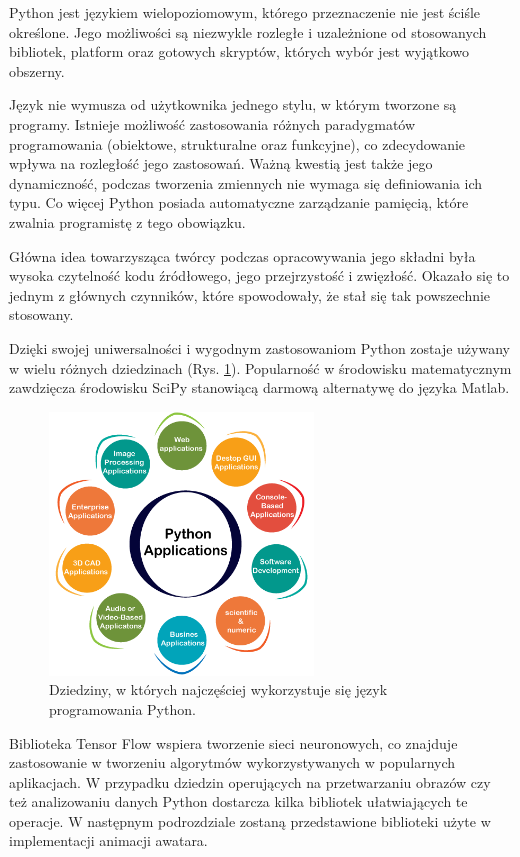 Python jest językiem wielopoziomowym, którego przeznaczenie nie jest ściśle określone. Jego możliwości są niezwykle rozległe i uzależnione od stosowanych bibliotek, platform oraz gotowych skryptów, których wybór jest wyjątkowo obszerny. 

Język nie wymusza od użytkownika jednego stylu, w którym tworzone są programy. Istnieje możliwość zastosowania różnych paradygmatów programowania (obiektowe, strukturalne oraz funkcyjne), co zdecydowanie wpływa na rozległość jego zastosowań. Ważną kwestią jest także jego dynamiczność, podczas tworzenia zmiennych nie wymaga się definiowania ich typu. Co więcej Python posiada automatyczne zarządzanie pamięcią, które zwalnia programistę z tego obowiązku. 

Główna idea towarzysząca twórcy podczas opracowywania jego składni była wysoka czytelność kodu źródłowego, jego przejrzystość i zwięzłość. Okazało się to jednym z głównych czynników, które spowodowały, że stał się tak powszechnie stosowany.

Dzięki swojej uniwersalności i wygodnym zastosowaniom Python zostaje używany w wielu różnych dziedzinach (Rys. \ref{fig:pythonUsage}). Popularność w środowisku matematycznym zawdzięcza środowisku SciPy stanowiącą darmową alternatywę do języka Matlab. 

\begin{figure}[h]
	\centering
	\includegraphics[width=7cm]{python_usage.png}
	\caption{Dziedziny, w których najczęściej wykorzystuje się język programowania Python.} 
	\label{fig:pythonUsage}
\end{figure}

Biblioteka Tensor Flow wspiera tworzenie sieci neuronowych, co znajduje zastosowanie w tworzeniu algorytmów wykorzystywanych w popularnych aplikacjach. \cite{PythonApps} W przypadku dziedzin operujących na przetwarzaniu obrazów czy też analizowaniu danych Python dostarcza kilka bibliotek ułatwiających te operacje. W następnym podrozdziale zostaną przedstawione biblioteki użyte w implementacji animacji awatara.

